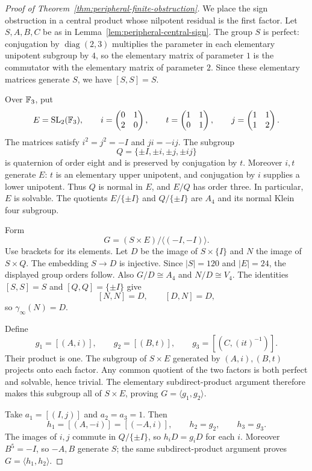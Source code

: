 \begin{proof}[Proof of Theorem~\ref{thm:peripheral-finite-obstruction}]
We place the sign obstruction in a central product whose nilpotent
residual is the first factor. Let $S,A,B,C$ be as in Lemma~\ref{lem:peripheral-central-sign}. The group $S$ is perfect:
conjugation by $\operatorname{diag}(2,3)$ multiplies the parameter in
each elementary unipotent subgroup by $4$, so the elementary matrix
of parameter $1$ is the commutator with the elementary matrix of
parameter $2$. Since these elementary matrices generate $S$, we have
$[S,S]=S$.

Over $\mathbb F_3$, put
\[
E=\operatorname{SL}_2(\mathbb F_3),\qquad
i=\begin{pmatrix}0&1\\2&0\end{pmatrix},\qquad
t=\begin{pmatrix}1&1\\0&1\end{pmatrix},\qquad
j=\begin{pmatrix}1&1\\1&2\end{pmatrix}.
\]
The matrices satisfy $i^2=j^2=-I$ and $ji=-ij$. The subgroup
\[
Q=\{\pm I,\pm i,\pm j,\pm ij\}
\]
is quaternion of order eight and is preserved by conjugation by $t$.
Moreover $i,t$ generate $E$: $t$ is an elementary upper unipotent, and
conjugation by $i$ supplies a lower unipotent. Thus $Q$ is normal in
$E$, and $E/Q$ has order three. In particular, $E$ is solvable. The
quotients $E/\{\pm I\}$ and $Q/\{\pm I\}$ are $A_4$ and its normal
Klein four subgroup.

Form
\[
G=(S\times E)/\langle(-I,-I)\rangle.
\]
Use brackets for its elements. Let $D$ be the image of $S\times\{I\}$
and $N$ the image of $S\times Q$. The embedding $S\to D$ is
injective. Since $|S|=120$ and $|E|=24$, the displayed group orders
follow. Also $G/D\cong A_4$ and $N/D\cong V_4$. The identities
$[S,S]=S$ and $[Q,Q]=\{\pm I\}$ give
\[
[N,N]=D,\qquad [D,N]=D,
\]
so $\gamma_{\infty}(N)=D$.

Define
\[
g_1=[(A,i)],\qquad g_2=[(B,t)],\qquad
g_3=[(C,(it)^{-1})].
\]
Their product is one. The subgroup of $S\times E$ generated by
$(A,i),(B,t)$ projects onto each factor. Any common quotient of the
two factors is both perfect and solvable, hence trivial. The elementary
subdirect-product argument therefore makes this subgroup all of
$S\times E$, proving $G=\langle g_1,g_2\rangle$.

Take $a_1=[(I,j)]$ and $a_2=a_3=1$. Then
\[
h_1=[(A,-i)]=[(-A,i)],\qquad h_2=g_2,\qquad h_3=g_3.
\]
The images of $i,j$ commute in $Q/\{\pm I\}$, so $h_iD=g_iD$ for
each $i$. Moreover $B^5=-I$, so $-A,B$ generate $S$; the same
subdirect-product argument proves $G=\langle h_1,h_2\rangle$.


\end{proof}
